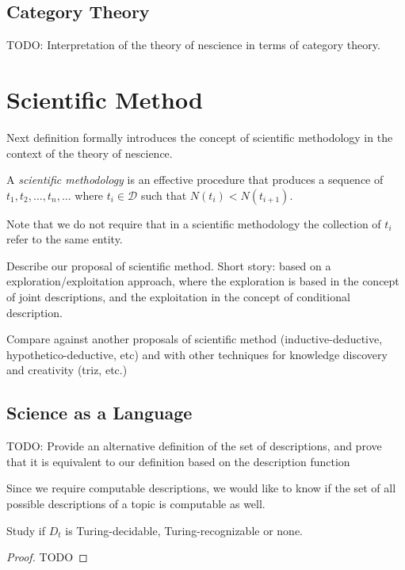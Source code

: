 %
%

\subsection{Category Theory}

{\color{red} TODO: Interpretation of the theory of nescience in terms of category theory.}


%
%

\section{Scientific Method}
\label{sec:scientific_method}

Next definition formally introduces the concept of scientific methodology in the context of the theory of nescience.

\begin{definition}
A \emph{scientific methodology} is an effective procedure that produces a sequence of $t_1, t_2, \ldots, t_n, \ldots$ where $t_i \in \mathcal{D}$ such that $N(t_i) < N(t_{i+1})$.
\end{definition}

Note that we do not require that in a scientific methodology the collection of $t_i$ refer to the same entity.


{\color{red} Describe our proposal of scientific method. Short story: based on a exploration/exploitation approach, where the exploration is based in the concept of joint descriptions, and the exploitation in the concept of conditional description.}

{\color{red} Compare against another proposals of scientific method (inductive-deductive, hypothetico-deductive, etc) and with other techniques for knowledge discovery and creativity (triz, etc.)}

\subsection{Science as a Language}

{\color{red} TODO: Provide an alternative definition of the set of descriptions, and prove that it is equivalent to our definition based on the description function}

Since we require computable descriptions, we would like to know if the set of all possible descriptions of a topic is computable as well.

\begin{proposition}
Study if $D_{t}$ is Turing-decidable, Turing-recognizable or none.
\end{proposition}
\begin{proof}
{\color{red} TODO}
\end{proof}

